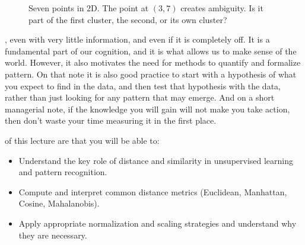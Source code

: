 \begin{figure}
\centering
{}
\caption{Seven points in 2D. The point at $(3, 7)$ creates ambiguity. Is it part of the first cluster, the second, or its own cluster?}
\label{fig:seven_points}
\end{figure}

, even with very little information, and even if it is completely off.
It is a fundamental part of our cognition, and it is what allows us to make sense of the world. However, it also motivates the need
for methods to quantify and formalize pattern. On that note it is also good practice to start with a hypothesis of what you expect to find in the data, and then test that hypothesis with the data, 
rather than just looking for any pattern that may emerge. And on a short managerial note, if the knowledge you will gain will not 
make you take action, then don't waste your time measuring it in the first place.


 of this lecture are that you will be able to:
\begin{itemize}
    \item Understand the key role of distance and similarity in unsupervised learning and pattern recognition.
    \item Compute and interpret common distance metrics (Euclidean, Manhattan, Cosine, Mahalanobis).
    \item Apply appropriate normalization and scaling strategies and understand why they are necessary.
\end{itemize}





